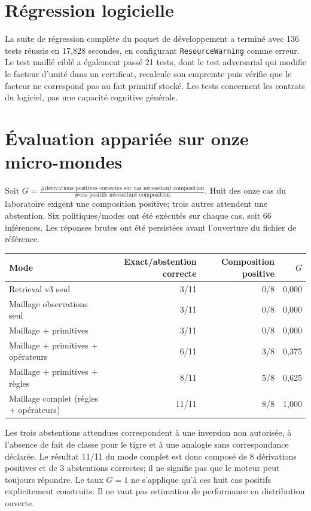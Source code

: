 \documentclass[11pt,a4paper]{book}
\begin{document}
\section{Régression logicielle}
La suite de régression complète du paquet de développement a terminé avec 136 tests réussis en 17,828 secondes, en configurant \texttt{ResourceWarning} comme erreur. Le test maillé ciblé a également passé 21 tests, dont le test adversarial qui modifie le facteur d'unité dans un certificat, recalcule son empreinte puis vérifie que le facteur ne correspond pas au fait primitif stocké. Les tests concernent les contrats du logiciel, pas une capacité cognitive générale.

\section{Évaluation appariée sur onze micro-mondes}
Soit $G=\frac{\#\text{dérivations positives correctes sur cas nécessitant composition}}{\#\text{cas positifs nécessitant composition}}$. Huit des onze cas du laboratoire exigent une composition positive; trois autres attendent une abstention. Six politiques/modes ont été exécutés sur chaque cas, soit 66 inférences. Les réponses brutes ont été persistées avant l'ouverture du fichier de référence.

\begin{center}
\begin{tabular}{lrrr}
\hline
Mode & Exact/abstention correcte & Composition positive & $G$ \\
\hline
Retrieval v3 seul & 3/11 & 0/8 & 0,000 \\
Maillage observations seul & 3/11 & 0/8 & 0,000 \\
Maillage + primitives & 3/11 & 0/8 & 0,000 \\
Maillage + primitives + opérateurs & 6/11 & 3/8 & 0,375 \\
Maillage + primitives + règles & 8/11 & 5/8 & 0,625 \\
Maillage complet (règles + opérateurs) & 11/11 & 8/8 & 1,000 \\
\hline
\end{tabular}
\end{center}

Les trois abstentions attendues correspondent à une inversion non autorisée, à l'absence de fait de classe pour le tigre et à une analogie sans correspondance déclarée. Le résultat 11/11 du mode complet est donc composé de 8 dérivations positives et de 3 abstentions correctes; il ne signifie pas que le moteur peut toujours répondre. Le taux $G=1$ ne s'applique qu'à ces huit cas positifs explicitement construits. Il ne vaut pas estimation de performance en distribution ouverte.
\end{document}
